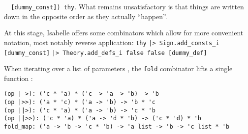 \begin{isabellebody}
\begin{isamarkuptext}
\verb|  [dummy_const]) thy|.
  What remains unsatisfactory is that things are written down in the opposite order
  as they actually ``happen''.%
\end{isamarkuptext}%
\isamarkuptrue%
%
\isadelimML
%
\endisadelimML
%
\isatagML
%
\endisatagML
{\isafoldML}%
%
\isadelimML
%
\endisadelimML
%
\begin{isamarkuptext}%
At this stage, Isabelle offers some combinators which allow for more convenient
  notation, most notably reverse application:
  \isasep\isanewline%
\verb|thy|\isasep\isanewline%
\verb||\verb,|,\verb|> Sign.add_consts_i [dummy_const]|\isasep\isanewline%
\verb||\verb,|,\verb|> Theory.add_defs_i false false [dummy_def]|%
\end{isamarkuptext}%
\isamarkuptrue%
%
\begin{isamarkuptext}%
\noindent When iterating over a list of parameters ,
  the \verb|fold| combinator lifts a single function :
\end{isamarkuptext}%
\isamarkuptrue%
%
\isadelimmlref
%
\endisadelimmlref
%
\isatagmlref
%
\begin{isamarkuptext}%
\begin{mldecls}
  \verb|(op |\verb,|,\verb|->): ('c * 'a) * ('c -> 'a -> 'b) -> 'b| \\
  \verb|(op |\verb,|,\verb|>>): ('a * 'c) * ('a -> 'b) -> 'b * 'c| \\
  \verb|(op |\verb,|,\verb||\verb,|,\verb|>): ('c * 'a) * ('a -> 'b) -> 'c * 'b| \\
  \verb|(op |\verb,|,\verb||\verb,|,\verb|>>): ('c * 'a) * ('a -> 'd * 'b) -> ('c * 'd) * 'b| \\
  \verb|fold_map: ('a -> 'b -> 'c * 'b) -> 'a list -> 'b -> 'c list * 'b| \\

\end{mldecls}
\end{isamarkuptext}
\end{isabellebody}

